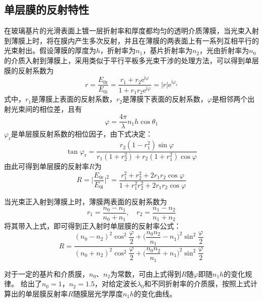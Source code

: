 \documentclass[cn,10pt,chinesefont=founder,math=mtpro2,cite=super,toc=onecol,twoside,openany]{elegantbook}
\begin{document}
\subsection{单层膜的反射特性}
在玻璃基片的光滑表面上镀一层折射率和厚度都均匀的透明介质薄膜，当光束入射到薄膜上时，将在膜内产生多次反射，并且在薄膜的两表面上有一系列互相平行的光束射出。假设薄膜的厚度为$h$，折射率为$n_1$，基片折射率为$n_2$，光由折射率为$n_0$的介质入射到薄膜上，采用类似于平行平板多光束干涉的处理方法，可以得到单层膜的反射系数为
\begin{equation}
r=\frac{E_{\mathrm{0r}}}{E_{\mathrm{0i}}}=\frac{r_1+r_2\mathrm{e}^{\mathrm{i}\varphi}}{1+r_1r_2\mathrm{e}^{\mathrm{i}\varphi}}=|r|\mathrm{e}^{\mathrm{i}\varphi_{\mathrm{r}}}
\end{equation}
式中，$r_1$是薄膜上表面的反射系数，$r_2$是薄膜下表面的反射系数，$\varphi$是相邻两个出射光束间的相位差，且有
\begin{equation}
\varphi=\frac{4\pi}{\lambda}n_1h\cos\theta_1
\end{equation}
$\varphi_{\mathrm{r}}$是单层膜反射系数的相位因子，由下式决定：
\begin{equation}
\tan\varphi_{\mathrm{r}}=\frac{r_2(1-r^2_1)\sin\varphi}{r_1(1+r^2_2)+r_2(1+r^2_1)\cos\varphi}
\end{equation}
由此可得到单层膜的反射率$R$为
\begin{equation}
R=\bigg|\frac{E_{0\mathrm{r}}}{E_{0\mathrm{i}}}\bigg|^2=\frac{r^2_1+r^2_2+2r_1r_2\cos\varphi}{1+r^2_1r^2_2+2r_1r_2\cos\varphi}
\end{equation}

当光束正入射到薄膜上时，薄膜两表面的反射系数为
\begin{equation}
r_1=\frac{n_0-n_1}{n_0+n_1},\quad r_2=\frac{n_1-n_2}{n_1+n_2}
\end{equation}
将其带入上式，即可得到正入射时单层膜的反射率公式：
\begin{equation}
R=\frac{(n_0-n_2)^2\cos^2\dfrac{\varphi}{2}+\bigg(\dfrac{n_0n_2}{n_1}-n_1\bigg)^2\sin^2\dfrac{\varphi}{2}}{(n_0+n_2)^2\cos^2\dfrac{\varphi}{2}+\bigg(\dfrac{n_0n_2}{n_1}+n_1\bigg)^2\sin^2\dfrac{\varphi}{2}}
\label{eq:reflectivity-of-monolayer}
\end{equation}

对于一定的基片和介质膜，$n_0$、$n_2$为常数，可由上式得到$R$随$\varphi$即随$n_1h$的变化规律。 给出了$n_0=1$，$n_2=1.5$，对给定波长$\lambda_0$和不同折射率的介质膜，按照上式计算出的单层膜反射率$R$随膜层光学厚度$n_1h$的变化曲线。
\end{document}
